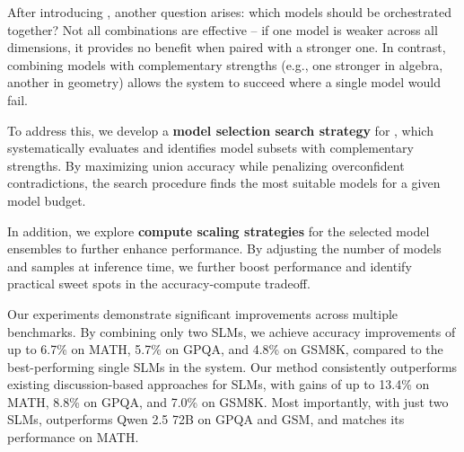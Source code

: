 After introducing \NAME{}, another question arises: which models should be orchestrated together? Not all combinations are effective -- if one model is weaker across all dimensions, it provides no benefit when paired with a stronger one. In contrast, combining models with complementary strengths (e.g., one stronger in algebra, another in geometry) allows the system to succeed where a single model would fail.

To address this, we develop a \textbf{model selection search strategy} for \NAME{}, which systematically evaluates and identifies model subsets with complementary strengths. By maximizing union accuracy while penalizing overconfident contradictions, the search procedure finds the most suitable models for a given model budget. 

In addition, we explore \textbf{compute scaling strategies} for the selected model ensembles to further enhance performance. By adjusting the number of models and samples at inference time, we further boost performance and identify practical sweet spots in the accuracy-compute tradeoff.





Our experiments demonstrate significant improvements across multiple benchmarks. By combining only two SLMs, we achieve accuracy improvements of up to 6.7\% on MATH, 5.7\% on GPQA, and 4.8\% on GSM8K, compared to the best-performing single SLMs in the system. Our method consistently outperforms existing discussion-based approaches for SLMs, with gains of up to 13.4\% on MATH, 8.8\% on GPQA, and 7.0\% on GSM8K. Most importantly,  with just two SLMs, \NAME{}  outperforms Qwen 2.5 72B on GPQA and GSM, and matches its performance on MATH.

